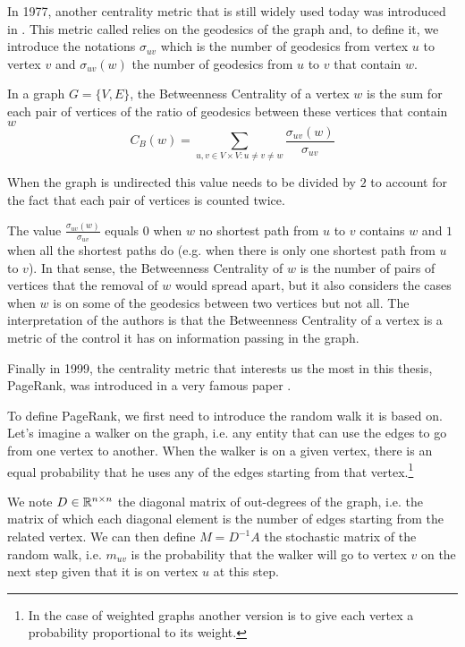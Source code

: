In 1977, another centrality metric that is still widely used today was introduced in \cite{freeman1977_BetweennessCentrality}. This metric called  relies on the geodesics of the graph and, to define it, we introduce the notations $\sigma_{uv}$ which is the number of geodesics from vertex $u$ to vertex $v$ and $\sigma_{uv}(w)$ the number of geodesics from $u$ to $v$ that contain $w$.

\begin{definition}
    In a graph $G = \{V, E\}$, the Betweenness Centrality of a vertex $w$ is the sum for each pair of vertices of the ratio of geodesics between these vertices that contain $w$
    \begin{equation}
        C_B(w) = \sum_{u,v \in V\times V : u\neq v \neq w} \frac{\sigma_{uv}(w)}{\sigma_{uv}}
    \end{equation}
\end{definition}

When the graph is undirected this value needs to be divided by $2$ to account for the fact that each pair of vertices is counted twice.

The value $\frac{\sigma_{uv}(w)}{\sigma_{uv}}$ equals $0$ when $w$ no shortest path from $u$ to $v$ contains $w$ and $1$ when all the shortest paths do (e.g. when there is only one shortest path from $u$ to $v$). In that sense, the Betweenness Centrality of $w$ is the number of pairs of vertices that the removal of $w$ would spread apart, but it also considers the cases when $w$ is on some of the geodesics between two vertices but not all. The interpretation of the authors is that the Betweenness Centrality of a vertex is a metric of the control it has on information passing in the graph.

Finally in 1999, the centrality metric that interests us the most in this thesis, PageRank, was introduced in a very famous paper \cite{pagerank}.

To define PageRank, we first need to introduce the random walk it is based on. Let's imagine a walker on the graph, i.e. any entity that can use the edges to go from one vertex to another. When the walker is on a given vertex, there is an equal probability that he uses any of the edges starting from that vertex.\footnote{In the case of weighted graphs another version is to give each vertex a probability proportional to its weight.}

We note $D \in \mathbb{R}^{n\times n}$ the diagonal matrix of out-degrees of the graph, i.e. the matrix of which each diagonal element is the number of edges starting from the related vertex. We can then define $M = D^{-1} A$ the stochastic matrix of the random walk, i.e. $m_{uv}$ is the probability that the walker will go to vertex $v$ on the next step given that it is on vertex $u$ at this step.

